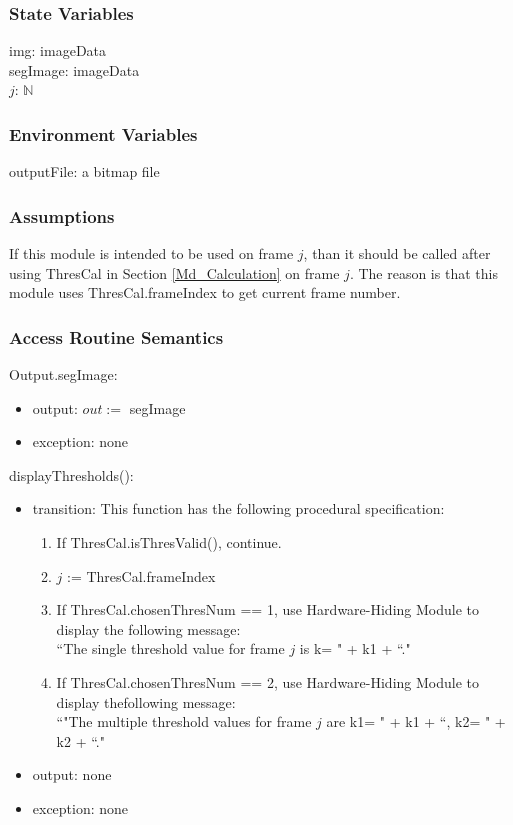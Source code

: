 \documentclass[12pt, titlepage]{article}
\begin{document}
\subsubsection{State Variables}

img: imageData\\
segImage: imageData\\
$j$: $\mathbb{N}$

\subsubsection{Environment Variables}

outputFile: a bitmap file

\subsubsection{Assumptions}

If this module is intended to be used on frame $j$, than it should be called
after using ThresCal in Section \ref{Md_Calculation} on frame $j$. The reason
is that this module uses ThresCal.frameIndex to get current frame number.

\subsubsection{Access Routine Semantics}

\noindent Output.segImage:
\begin{itemize}
\item output: $out :=$ segImage
\item exception: none 
\end{itemize}

\noindent displayThresholds():
\begin{itemize}
\item transition:
This function has the following procedural specification:
\begin{enumerate}
\item If ThresCal.isThresValid(), continue.
\item $j$ := ThresCal.frameIndex
\item If ThresCal.chosenThresNum == 1, use Hardware-Hiding Module to display
the following message:\\
``The single threshold value for frame $j$ is k= " + k1 + ``."
\item If ThresCal.chosenThresNum == 2, use Hardware-Hiding Module to display
thefollowing message:\\
``"The multiple threshold values for frame $j$ are k1= " + k1 +
``, k2= " + k2 + ``."
\end{enumerate}
\item output: none
\item exception: none
\end{itemize}
\end{document}
